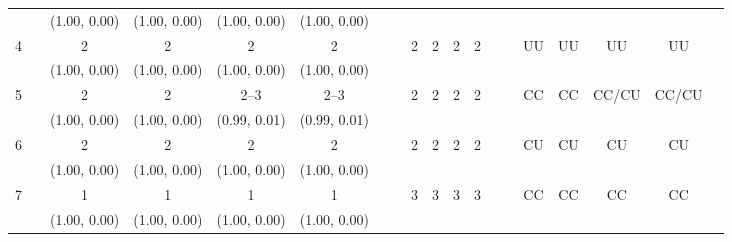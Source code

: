 \documentclass[12pt]{article}
\begin{document}
\begin{table}[h!]
{\begin{tabular}{@{\extracolsep{-9pt}}ccccccccccccccccccc@{}}
 && (1.00, 0.00) & (1.00, 0.00) & (1.00, 0.00)       & (1.00, 0.00)       & \hspace{5mm }& \hspace{5mm }&      &    &      &       &\hspace{0.5 mm }& &  &  &       &  \\
4 && 2  & 2  & 2       & 2       & \hspace{5mm }& \hspace{5mm }& 2     & 2    & 2      & 2      & \hspace{0.5 mm }& & UU & UU   & UU       & UU \\
 && (1.00, 0.00) & (1.00, 0.00) & (1.00, 0.00)       & (1.00, 0.00)       & \hspace{5mm }& \hspace{5mm }&      &     &       &       & \hspace{0.5 mm }& & &    &        &  \\
5 && 2  & 2  & 2--3  & 2--3  & \hspace{5mm }& \hspace{5mm }& 2     & 2    & 2      & 2     & \hspace{0.5 mm }& & CC & CC    & CC/CU & CC/CU \\
 &&  (1.00, 0.00) &  (1.00, 0.00) & (0.99, 0.01) & (0.99, 0.01) & \hspace{5mm }& \hspace{5mm }&      &     &      &     & \hspace{0.5 mm }& & &   &  &  \\
6 && 2  & 2 & 2       & 2       & \hspace{5mm }& \hspace{5mm }& 2     & 2    & 2      & 2     & \hspace{0.5 mm }& & CU & CU    & CU        & CU \\ 
 &&  (1.00, 0.00) &  (1.00, 0.00) & (1.00, 0.00)       & (1.00, 0.00)       & \hspace{5mm }& \hspace{5mm }&      &     &       &      & \hspace{0.5 mm }& &  &     &         &  \\ 
7 && 1  & 1  & 1        & 1         & \hspace{5mm }& \hspace{5mm }& 3     & 3    & 3       & 3     & \hspace{1mm }& & CC & CC    & CC        & CC \\ 
 && (1.00, 0.00)  & (1.00, 0.00)  & (1.00, 0.00)        & (1.00, 0.00)         & \hspace{5mm }& \hspace{5mm }&      &    &       &      & \hspace{1mm }& &  &     &         &  \\  
 
\hline
\end{tabular}}
\end{table}
\end{document}
